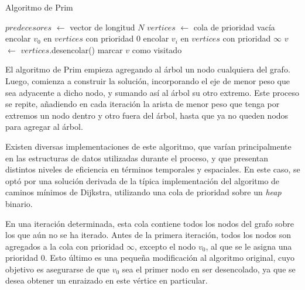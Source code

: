     \begin{algorithm}
        \caption{Algoritmo de Prim}
        \label{algo:prim}

        $predecesores$ $\gets$ vector de longitud $N$ \;
        $vertices$ $\gets$ cola de prioridad vacía \;
        encolar $v_0$ en $vertices$ con prioridad $0$ \;
         {
            encolar $v_i$ en $vertices$ con prioridad $\infty$ \;
        }
         {
            $v$ $\gets$ $vertices$.desencolar() \;
            marcar $v$ como visitado \;
        }
    \end{algorithm}

    El algoritmo de Prim empieza agregando al árbol un nodo cualquiera del
    grafo. Luego, comienza a construir la solución, incorporando el eje de
    menor peso que sea adyacente a dicho nodo, y sumando así al árbol su otro
    extremo. Este proceso se repite, añadiendo en cada iteración la arista de
    menor peso que tenga por extremos un nodo dentro y otro fuera del árbol,
    hasta que ya no queden nodos para agregar al árbol.

    Existen diversas implementaciones de este algoritmo, que varían
    principalmente en las estructuras de datos utilizadas durante el proceso,
    y que presentan distintos niveles de eficiencia en términos temporales y
    espaciales. En este caso, se optó por una solución derivada de la
    típica implementación del algoritmo de caminos mínimos de Dijkstra,
    utilizando una cola de prioridad sobre un \emph{heap} binario.

    En una iteración determinada, esta cola contiene todos los nodos del grafo
    sobre los que aún no se ha iterado. Antes de la primera iteración, todos
    los nodos son agregados a la cola con prioridad $\infty$, excepto el nodo
    $v_0$, al que se le asigna una prioridad $0$. Esto último es una pequeña
    modificación al algoritmo original, cuyo objetivo es asegurarse de
    que $v_0$ sea el primer nodo en ser desencolado, ya que se desea obtener
    un  enraizado en este vértice en particular.

